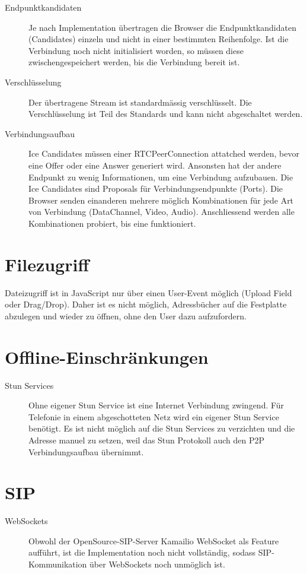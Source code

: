 	 	\begin{description}
			\item[Endpunktkandidaten] Je nach Implementation übertragen die Browser die Endpunktkandidaten (Candidates) einzeln und nicht in einer bestimmten Reihenfolge. Ist die Verbindung noch nicht initialisiert worden, so müssen diese zwischengespeichert werden, bis die Verbindung bereit ist.

			\item[Verschlüsselung] Der übertragene Stream ist standardmässig verschlüsselt. Die Verschlüsselung ist Teil des Standards und kann nicht abgeschaltet werden.
			
			\item[Verbindungsaufbau] Ice Candidates müssen einer RTCPeerConnection attatched werden, bevor eine Offer oder eine Answer generiert wird. Ansonsten hat der andere Endpunkt zu wenig Informationen, um eine Verbindung aufzubauen. Die Ice Candidates sind Proposals für Verbindungsendpunkte (Ports). Die Browser senden einanderen mehrere möglich Kombinationen für jede Art von Verbindung (DataChannel, Video, Audio). Anschliessend werden alle Kombinationen probiert, bis eine funktioniert.
	 	\end{description}
	 
	 \section{Filezugriff}
	 	Dateizugriff ist in JavaScript nur über einen User-Event möglich (Upload
	 	Field oder Drag/Drop). Daher ist es nicht möglich, Adressbücher auf die
	 	Festplatte abzulegen und wieder zu öffnen, ohne den User dazu aufzufordern.
	 	
	 
	 \section{Offline-Einschränkungen}
	 	\begin{description}
			\item[Stun Services] Ohne eigener Stun Service ist eine Internet Verbindung zwingend. Für Telefonie in einem abgeschotteten Netz wird ein eigener Stun Service benötigt. Es ist nicht möglich auf die Stun Services zu verzichten und die Adresse manuel zu setzen, weil das Stun Protokoll auch den P2P Verbindungsaufbau übernimmt.
	 	\end{description}
	 		
	 \section{SIP}
	 	\begin{description}
			\item[WebSockets] Obwohl der OpenSource-SIP-Server Kamailio WebSocket als Feature aufführt,
	 		ist die Implementation noch nicht vollständig, sodass SIP-Kommunikation über
	 		WebSockets noch unmöglich ist.
	 	\end{description}
	 		
